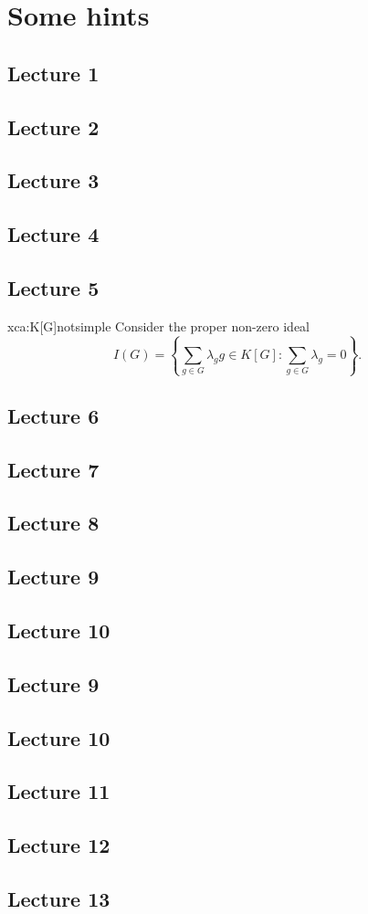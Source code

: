 \chapter{Some hints}

\section*{Lecture 1}
\section*{Lecture 2}
\section*{Lecture 3}
\section*{Lecture 4}
\section*{Lecture 5}

\begin{sol}{xca:K[G]notsimple}
Consider the proper non-zero ideal 
\[
	I(G)=\left\{\sum_{g\in G}\lambda_gg\in K[G]:\sum_{g\in G}\lambda_g=0\right\}.
\]
\end{sol}
\section*{Lecture 6}
\section*{Lecture 7}
\section*{Lecture 8}
\section*{Lecture 9}
\section*{Lecture 10}
\section*{Lecture 9}
\section*{Lecture 10}
\section*{Lecture 11}
\section*{Lecture 12}
\section*{Lecture 13}
